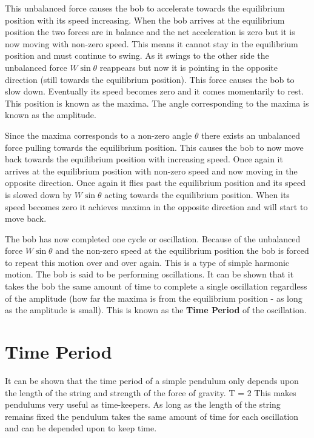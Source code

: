    This unbalanced force causes the bob to accelerate towards the equilibrium position with its speed increasing. When the bob arrives at the equilibrium position the two forces are in balance and the net acceleration is zero but it is now moving with non-zero speed. This means it cannot stay in the equilibrium position and must continue to swing. As it swings to the other side the unbalanced force $W \sin \theta$ reappears but now it is pointing in the opposite direction (still towards the equilibrium position). This force causes the bob to slow down. Eventually its speed becomes zero and it comes momentarily to rest. This position is known as the maxima. The angle corresponding to the maxima is known as the amplitude.

   Since the maxima corresponds to a non-zero angle $\theta$ there exists an unbalanced force pulling towards the equilibrium position. This causes the bob to now move back towards the equilibrium position with increasing speed. Once again it arrives at the equilibrium position with non-zero speed and now moving in the opposite direction. Once again it flies past the equilibrium position and its speed is slowed down by $W \sin \theta$ acting towards the equilibrium position. When its speed becomes zero it achieves maxima in the opposite direction and will start to move back.

   The bob has now completed one cycle or oscillation. Because of the unbalanced force $W \sin \theta$ and the non-zero speed at the equilibrium position the bob is forced to repeat this motion over and over again. This is a type of simple harmonic motion. The bob is said to be performing oscillations. It can be shown that it takes the bob the same amount of time to complete a single oscillation regardless of the amplitude (how far the maxima is from the equilibrium position - as long as the amplitude is small). This is known as the \textbf{Time Period} of the oscillation.

\section{Time Period}

   It can be shown that the time period of a simple pendulum only depends upon the length of the string and strength of the force of gravity.
   \beq
      T = 2 \pi {}
   \eeq
   This makes pendulums very useful as time-keepers. As long as the length of the string remains fixed the pendulum takes the same amount of time for each oscillation and can be depended upon to keep time.
